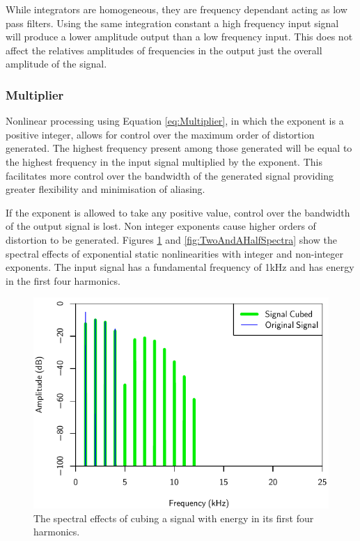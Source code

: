 			While integrators are homogeneous, they are frequency dependant acting as low pass filters. Using
			the same integration constant a high frequency input signal will produce a lower amplitude output
			than a low frequency input. This does not affect the relatives amplitudes of frequencies in the
			output just the overall amplitude of the signal.

		\subsubsection*{Multiplier}
			Nonlinear processing using Equation \ref{eq:Multiplier}, in which the exponent is a positive
			integer, allows for control over the maximum order of distortion generated. The highest frequency
			present among those generated will be equal to the highest frequency in the input signal multiplied
			by the exponent. This facilitates more control over the bandwidth of the generated signal providing
			greater flexibility and minimisation of aliasing.

			If the exponent is allowed to take any positive value, control over the bandwidth of the output
			signal is lost. Non integer exponents cause higher orders of distortion to be generated. Figures
			\ref{fig:CubedSpectra} and \ref{fig:TwoAndAHalfSpectra} show the spectral effects of exponential
			static nonlinearities with integer and non-integer exponents. The input signal has a fundamental frequency of
			1kHz and has energy in the first four harmonics.

			\begin{figure}[h!]
				\centering
				\includegraphics{chapter5/Images/CubedSpectra.pdf}
				\caption{The spectral effects of cubing a signal with energy in its first four harmonics.}
				\label{fig:CubedSpectra}
			\end{figure}

